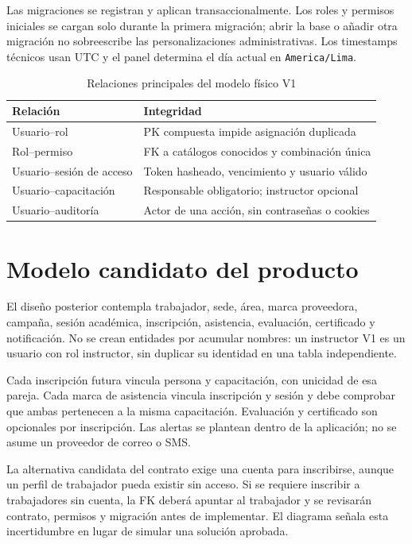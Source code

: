 Las migraciones se registran y aplican transaccionalmente. Los roles y permisos iniciales se cargan solo durante la primera migración; abrir la base o añadir otra migración no sobreescribe las personalizaciones administrativas. Los timestamps técnicos usan UTC y el panel determina el día actual en \texttt{America/Lima}.

\begin{table}[htbp]
\centering
\caption{Relaciones principales del modelo físico V1}
\begin{tabular}{P{5.2cm}P{6.8cm}}
\toprule Relación & Integridad \\ \midrule
Usuario--rol & PK compuesta impide asignación duplicada \\
Rol--permiso & FK a catálogos conocidos y combinación única \\
Usuario--sesión de acceso & Token hasheado, vencimiento y usuario válido \\
Usuario--capacitación & Responsable obligatorio; instructor opcional \\
Usuario--auditoría & Actor de una acción, sin contraseñas o cookies \\
\bottomrule
\end{tabular}
\end{table}

\section{Modelo candidato del producto}
El diseño posterior contempla trabajador, sede, área, marca proveedora, campaña, sesión académica, inscripción, asistencia, evaluación, certificado y notificación. No se crean entidades por acumular nombres: un instructor V1 es un usuario con rol instructor, sin duplicar su identidad en una tabla independiente.

Cada inscripción futura vincula persona y capacitación, con unicidad de esa pareja. Cada marca de asistencia vincula inscripción y sesión y debe comprobar que ambas pertenecen a la misma capacitación. Evaluación y certificado son opcionales por inscripción. Las alertas se plantean dentro de la aplicación; no se asume un proveedor de correo o SMS.

La alternativa candidata del contrato exige una cuenta para inscribirse, aunque un perfil de trabajador pueda existir sin acceso. Si se requiere inscribir a trabajadores sin cuenta, la FK deberá apuntar al trabajador y se revisarán contrato, permisos y migración antes de implementar. El diagrama señala esta incertidumbre en lugar de simular una solución aprobada.

